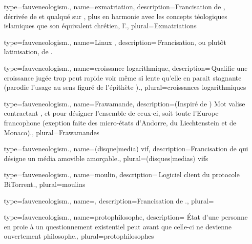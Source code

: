 {
  type=fauveneologism.,
    name={exmatriation},
    description={Francisation de , dérrivée de  et qualqué sur , plus en harmonie avec les concepts téologiques islamiques que son équivalent chrétien, l’.},
    plural={Exmatriations}
}

{
  type=fauveneologism.,
    name={Linux },
    description={ Francisation, ou plutôt latinisation, de \href{https://fr.wikipedia.org/wiki/Linux\_From\_Scratch}{}.}
}

{
  type=fauveneologism.,
    name={croissance logarithmique},
    description={ Qualifie une croissance jugée trop peut rapide voir même si lente qu’elle en parait stagnante (parodie l’usage au sens figuré de l’épithète ).},
    plural={croissances logarithmiques}
}

{
  type=fauveneologism.,
    name={Frawamande},
    description={(Inspiré de ) Mot valise contractant ,  et  pour désigner l’ensemble de ceux-ci, soit toute l’Europe francophone (exeption faite des micro-états d’Andorre, du Liechtenstein et de Monaco).},
    plural={Frawamandes}
}

{
  type=fauveneologism.,
    name={(disque|media) vif},
    description={Francisation de  qui désigne un média amovible amorçable.},
    plural={(disques|medias) vifs}
}

{
  type=fauveneologism.,
    name={moulin},
    description={ Logiciel client du protocole BiTorrent.},
    plural={moulins}
}

{
  type=fauveneologism.,
    name={},
    description={Francisation de \href{https://fr.wikipedia.org/wiki/Gameplay}{}.},
    plural={}
}

{
  type=fauveneologism.,
    name={protophilosophe},
    description={ État d’une personne en proie à un questionnement existentiel peut avant que celle-ci ne devienne ouvertement philosophe.},
    plural={protophilosophes}
}

